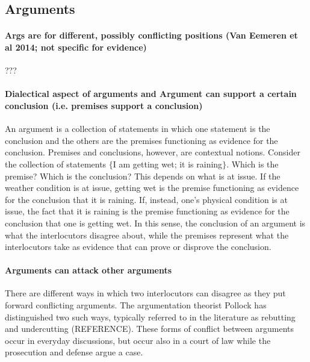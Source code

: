 \documentclass[10pt]{article}
\begin{document}
\subsection{Arguments}


\paragraph{Args are for different, possibly conflicting positions (Van Eemeren et al 2014; not specific for evidence)}

???

\paragraph{Dialectical aspect of arguments and Argument can support a certain conclusion (i.e. premises support a conclusion)}

An argument is a collection of statements in which one statement is the conclusion and 
the others are the premises functioning as evidence for the conclusion. 
Premises and conclusions, however, are contextual notions. Consider the collection of statements $\{$I am getting wet; it is raining$\}$. Which is the premise? Which is the conclusion? 
This depends on what is at issue. If the weather condition is at issue, getting wet is the premise functioning as evidence for the conclusion 
that it is raining. If, instead, one's physical condition is at issue, the fact that it 
is raining is the premise functioning as evidence for the conclusion that one is getting wet. In this sense, the conclusion of an argument 
is what the interlocutors disagree about, while the premises 
represent what the interlocutors take as evidence that can prove or disprove the conclusion. 
\paragraph{Arguments can attack other arguments}
		
		
		
There are different ways in which two interlocutors can disagree as they put forward 
conflicting arguments. The argumentation theorist Pollock has distinguished 
two such ways, typically referred to in the literature as rebutting and undercutting  (REFERENCE). These forms of conflict between arguments 
occur in everyday discussions, but occur also in a court of law while the prosecution and defense argue a case. 
\end{document}
